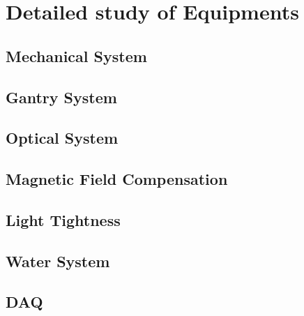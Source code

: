 \section{Detailed study of Equipments}









\subsection{Mechanical System}







\subsection{Gantry System}

\subsection{Optical System}

\subsection{Magnetic Field Compensation}

\subsection{Light Tightness}

\subsection{Water System}

\subsection{DAQ}
\label{}

